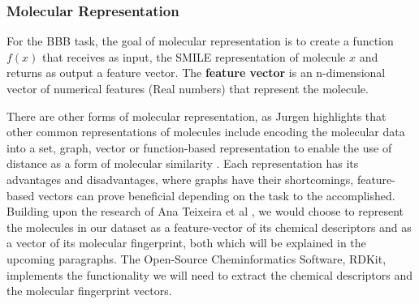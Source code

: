 \documentclass[a4paper,12pt]{report}
\begin{document}
			\subsubsection{Molecular Representation}
			For the BBB task, the goal of molecular representation is to create a function $f(x)$ that receives as input, the SMILE representation of molecule $x$ and returns as output a feature vector. The \textbf{feature vector} is an n-dimensional vector of numerical features (Real numbers) that represent the molecule. 

			There are other forms of molecular representation, as Jurgen \cite{Jurgen2004} highlights that other common representations of molecules include encoding the molecular data into a set, graph, vector or function-based representation to enable the use of distance as a form of molecular similarity \cite{Jurgen2004}. Each representation has its advantages and disadvantages, where graphs have their shortcomings, feature-based vectors can prove beneficial depending on the task to the accomplished. Building upon the research of Ana Teixeira et al \cite{Anaetal2012}, we would choose to represent the molecules in our dataset as a feature-vector of its chemical descriptors and as a vector of its molecular fingerprint, both which will be explained in the upcoming paragraphs. The Open-Source Cheminformatics Software, RDKit, implements the functionality we will need to extract the chemical descriptors and the molecular fingerprint vectors.
\end{document}
